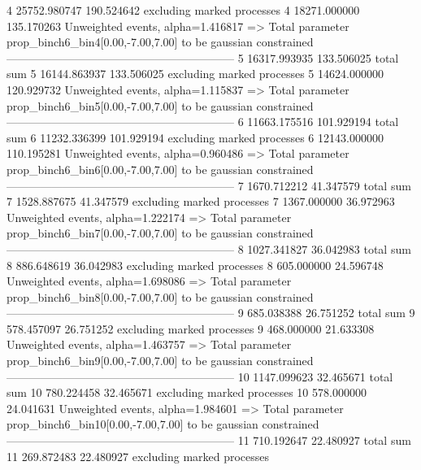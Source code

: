 4          25752.980747    190.524642      excluding marked processes    
4          18271.000000    135.170263      Unweighted events, alpha=1.416817
  => Total parameter prop_binch6_bin4[0.00,-7.00,7.00] to be gaussian constrained
------------------------------------------------------------
5          16317.993935    133.506025      total sum                     
5          16144.863937    133.506025      excluding marked processes    
5          14624.000000    120.929732      Unweighted events, alpha=1.115837
  => Total parameter prop_binch6_bin5[0.00,-7.00,7.00] to be gaussian constrained
------------------------------------------------------------
6          11663.175516    101.929194      total sum                     
6          11232.336399    101.929194      excluding marked processes    
6          12143.000000    110.195281      Unweighted events, alpha=0.960486
  => Total parameter prop_binch6_bin6[0.00,-7.00,7.00] to be gaussian constrained
------------------------------------------------------------
7          1670.712212     41.347579       total sum                     
7          1528.887675     41.347579       excluding marked processes    
7          1367.000000     36.972963       Unweighted events, alpha=1.222174
  => Total parameter prop_binch6_bin7[0.00,-7.00,7.00] to be gaussian constrained
------------------------------------------------------------
8          1027.341827     36.042983       total sum                     
8          886.648619      36.042983       excluding marked processes    
8          605.000000      24.596748       Unweighted events, alpha=1.698086
  => Total parameter prop_binch6_bin8[0.00,-7.00,7.00] to be gaussian constrained
------------------------------------------------------------
9          685.038388      26.751252       total sum                     
9          578.457097      26.751252       excluding marked processes    
9          468.000000      21.633308       Unweighted events, alpha=1.463757
  => Total parameter prop_binch6_bin9[0.00,-7.00,7.00] to be gaussian constrained
------------------------------------------------------------
10         1147.099623     32.465671       total sum                     
10         780.224458      32.465671       excluding marked processes    
10         578.000000      24.041631       Unweighted events, alpha=1.984601
  => Total parameter prop_binch6_bin10[0.00,-7.00,7.00] to be gaussian constrained
------------------------------------------------------------
11         710.192647      22.480927       total sum                     
11         269.872483      22.480927       excluding marked processes    
